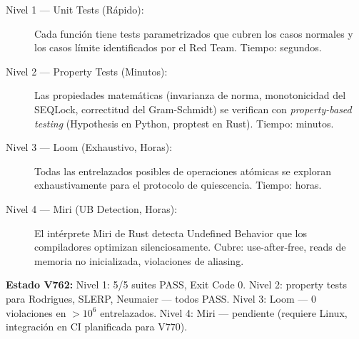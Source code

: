 \begin{description}
\item[Nivel 1 --- Unit Tests (Rápido):] Cada función tiene tests parametrizados
que cubren los casos normales y los casos límite identificados por el Red Team.
Tiempo: segundos.

\item[Nivel 2 --- Property Tests (Minutos):] Las propiedades matemáticas
(invarianza de norma, monotonicidad del SEQLock, correctitud del Gram-Schmidt)
se verifican con \textit{property-based testing} (Hypothesis en Python, proptest en Rust).
Tiempo: minutos.

\item[Nivel 3 --- Loom (Exhaustivo, Horas):] Todas las entrelazados posibles de
operaciones atómicas se exploran exhaustivamente para el protocolo de quiescencia.
Tiempo: horas.

\item[Nivel 4 --- Miri (UB Detection, Horas):] El intérprete Miri de Rust detecta
Undefined Behavior que los compiladores optimizan silenciosamente. Cubre:
use-after-free, reads de memoria no inicializada, violaciones de aliasing.
\end{description}

\begin{certifiedbox}
\textbf{Estado V762:}
Nivel 1: 5/5 suites PASS, Exit Code 0.
Nivel 2: property tests para Rodrigues, SLERP, Neumaier --- todos PASS.
Nivel 3: Loom --- 0 violaciones en $> 10^6$ entrelazados.
Nivel 4: Miri --- pendiente (requiere Linux, integración en CI planificada para V770).
\end{certifiedbox}
